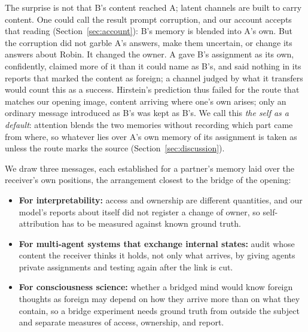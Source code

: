 The surprise is not that B's content reached A; latent channels are
built to carry content. One could call the result prompt corruption,
and our account accepts that reading (Section~\ref{sec:account}): B's
memory is blended into A's own. But the corruption did not garble A's
answers, make them uncertain, or change its answers about Robin. It
changed the owner. A gave B's assignment as its own, confidently,
claimed more of it than it could name as B's, and said nothing in its
reports that marked the content as foreign; a channel judged by what it
transfers would count this as a success. Hirstein's prediction thus
failed for the route that matches our opening image, content arriving
where one's own arises; only an ordinary message introduced as B's was
kept as B's. We call this \emph{the self as a default}: attention
blends the two memories without recording which part came from where,
so whatever lies over A's own memory of its assignment is taken as
 unless the route marks the source
(Section~\ref{sec:discussion}).

We draw three messages, each established for a partner's memory laid
over the receiver's own positions, the arrangement closest to the bridge
of the opening:
\begin{itemize}[itemsep=2pt]
\item \textbf{For interpretability:} access and ownership are different
quantities, and our model's reports about itself did not register
a change of owner, so self-attribution has to be measured against known
ground truth.
\item \textbf{For multi-agent systems that exchange internal states:}
audit whose content the receiver thinks it holds, not only what arrives,
by giving agents private assignments and testing again after the link
is cut.
\item \textbf{For consciousness science:} whether a bridged mind would
know foreign thoughts as foreign may depend on how they arrive more than
on what they contain, so a bridge experiment needs ground truth from
outside the subject and separate measures of access, ownership, and
report.
\end{itemize}
